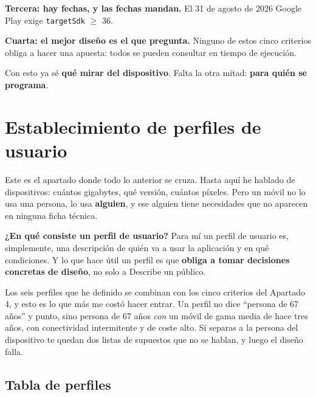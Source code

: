 \documentclass[11pt,a4paper]{article}
\newcommand{\code}[1]{\texttt{\color{ink}#1}}
\newcommand{\campo}[1]{\textbf{\color{ink}#1}}
\begin{document}
	\textbf{Tercera: hay fechas, y las fechas mandan.} El 31 de agosto de 2026 Google Play exige \code{targetSdk} $\geq$ 36.
	
	\textbf{Cuarta: el mejor diseño es el que pregunta.} Ninguno de estos cinco criterios obliga a hacer una apuesta: todos se pueden consultar en tiempo de ejecución.
	
	Con esto ya sé \textbf{qué mirar del dispositivo}. Falta la otra mitad: \textbf{para quién se programa}.
	
	\newpage
	\section{Establecimiento de perfiles de usuario}
	
	Este es el apartado donde todo lo anterior se cruza. Hasta aquí he hablado de dispositivos: cuántos gigabytes, qué versión, cuántos píxeles. Pero un móvil no lo usa una persona, lo usa \textbf{alguien}, y ese alguien tiene necesidades que no aparecen en ninguna ficha técnica.
	
	\campo{¿En qué consiste un perfil de usuario?}
	Para mí un perfil de usuario es, simplemente, una descripción de quién va a usar la aplicación y en qué condiciones. Y lo que hace útil un perfil es que \textbf{obliga a tomar decisiones concretas de diseño}, no solo a Describe un público.
	
	Los seis perfiles que he definido se combinan con los cinco criterios del Apartado 4, y esto es lo que más me costó hacer entrar. Un perfil no dice \enquote{persona de 67 años} y punto, sino persona de 67 años \emph{con} un móvil de gama media de hace tres años, con conectividad intermitente y de coste alto. Si separas a la persona del dispositivo te quedan dos listas de supuestos que no se hablan, y luego el diseño falla.
	
	\subsection{Tabla de perfiles}
	
\end{document}
